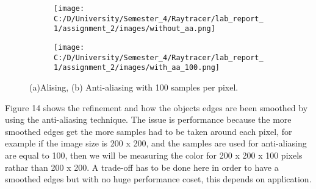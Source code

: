 \documentclass{article}
\begin{document}
\begin{figure}[ht]
	\begin{subfigure}{.3\textwidth}
		\centering
		\texttt{[image: C:/D/University/Semester\_4/Raytracer/lab\_report\_1/assignment\_2/images/without\_aa.png]}  
		\caption{}
		\label{fig:sub-first}
	\end{subfigure}
	\begin{subfigure}{.3\textwidth}
		\centering
		\texttt{[image: C:/D/University/Semester\_4/Raytracer/lab\_report\_1/assignment\_2/images/with\_aa\_100.png]}  
		\caption{}
		\label{fig:sub-second}
	\end{subfigure}
	
	\caption{(a)Alising,  (b) Anti-aliasing with 100 samples per pixel.}
	\label{fig:fig}
\end{figure}


Figure 14 shows the refinement and how the objects edges are been smoothed by using the anti-aliasing technique. The issue is performance because the more smoothed edges get the more samples had to be taken around each pixel, for example if the image size is 200 x 200, and the samples are used for anti-aliasing are equal to 100, then we will be measuring the color for 200 x 200 x 100 pixels rathar than 200 x 200. 
A trade-off has to be done here in order to have a smoothed edges but with no huge performance coset, this depends on application. 





\end{document}
